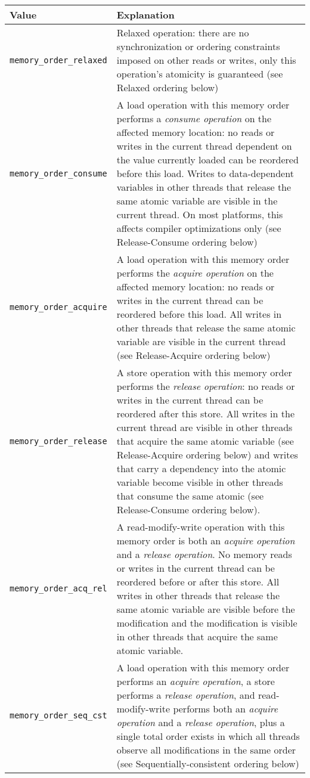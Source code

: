 \documentclass[a4paper,12pt,notitlepage,twoside,openright]{article}
\begin{document}
\begin{longtabu} to \columnwidth {lX}
  \toprule
  \rowfont[c]\bfseries
  Value & Explanation \\\midrule\endhead
  \bottomrule\endfoot
  \texttt{memory\_order\_relaxed} & Relaxed operation: there are no synchronization or ordering constraints imposed on other reads or writes, only this operation's atomicity is guaranteed (see Relaxed ordering below) \\
  \texttt{memory\_order\_consume} & A load operation with this memory order performs a \emph{consume operation} on the affected memory location: no reads or writes in the current thread dependent on the value currently loaded can be reordered before this load. Writes to data-dependent variables in other threads that release the same atomic variable are visible in the current thread. On most platforms, this affects compiler optimizations only (see Release-Consume ordering below) \\
  \texttt{memory\_order\_acquire} & A load operation with this memory order performs the \emph{acquire operation} on the affected memory location: no reads or writes in the current thread can be reordered before this load. All writes in other threads that release the same atomic variable are visible in the current thread (see Release-Acquire ordering below) \\
  \texttt{memory\_order\_release} & A store operation with this memory order performs the \emph{release operation}: no reads or writes in the current thread can be reordered after this store. All writes in the current thread are visible in other threads that acquire the same atomic variable (see Release-Acquire ordering below) and writes that carry a dependency into the atomic variable become visible in other threads that consume the same atomic (see Release-Consume ordering below). \\
  \texttt{memory\_order\_acq\_rel} & A read-modify-write operation with this memory order is both an \emph{acquire operation} and a \emph{release operation}. No memory reads or writes in the current thread can be reordered before or after this store. All writes in other threads that release the same atomic variable are visible before the modification and the modification is visible in other threads that acquire the same atomic variable. \\
  \texttt{memory\_order\_seq\_cst} & A load operation with this memory order performs an \emph{acquire operation}, a store performs a \emph{release operation}, and read-modify-write performs both an \emph{acquire operation} and a \emph{release operation}, plus a single total order exists in which all threads observe all modifications in the same order (see Sequentially-consistent ordering below) \\
\end{longtabu}
\end{document}
